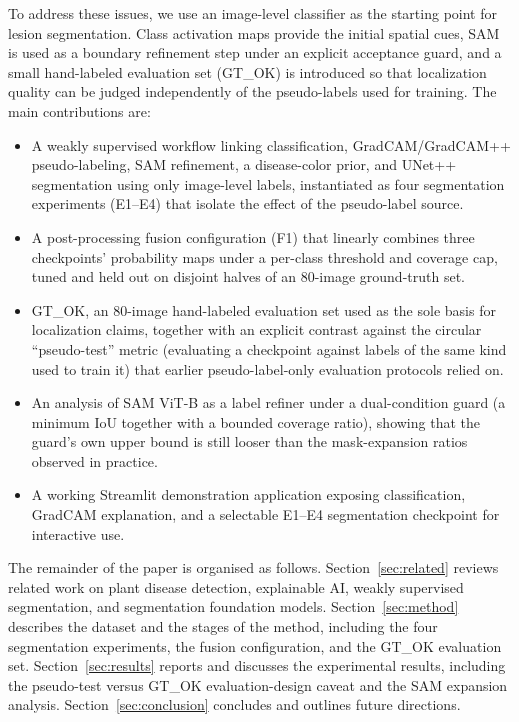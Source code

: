 \documentclass[final,5p,times,twocolumn,authoryear]{elsarticle}
\begin{document}
To address these issues, we use an image-level classifier as the starting point for lesion segmentation. Class activation maps provide the initial spatial cues, SAM is used as a boundary refinement step under an explicit acceptance guard, and a small hand-labeled evaluation set (GT\_OK) is introduced so that localization quality can be judged independently of the pseudo-labels used for training. The main contributions are:
\begin{itemize}
\item A weakly supervised workflow linking classification, GradCAM/GradCAM++ pseudo-labeling, SAM refinement, a disease-color prior, and UNet++ segmentation using only image-level labels, instantiated as four segmentation experiments (E1--E4) that isolate the effect of the pseudo-label source.
\item A post-processing fusion configuration (F1) that linearly combines three checkpoints' probability maps under a per-class threshold and coverage cap, tuned and held out on disjoint halves of an 80-image ground-truth set.
\item GT\_OK, an 80-image hand-labeled evaluation set used as the sole basis for localization claims, together with an explicit contrast against the circular ``pseudo-test'' metric (evaluating a checkpoint against labels of the same kind used to train it) that earlier pseudo-label-only evaluation protocols relied on.
\item An analysis of SAM ViT-B as a label refiner under a dual-condition guard (a minimum IoU together with a bounded coverage ratio), showing that the guard's own upper bound is still looser than the mask-expansion ratios observed in practice.
\item A working Streamlit demonstration application exposing classification, GradCAM explanation, and a selectable E1--E4 segmentation checkpoint for interactive use.
\end{itemize}

The remainder of the paper is organised as follows. Section~\ref{sec:related} reviews related work on plant disease detection, explainable AI, weakly supervised segmentation, and segmentation foundation models. Section~\ref{sec:method} describes the dataset and the stages of the method, including the four segmentation experiments, the fusion configuration, and the GT\_OK evaluation set. Section~\ref{sec:results} reports and discusses the experimental results, including the pseudo-test versus GT\_OK evaluation-design caveat and the SAM expansion analysis. Section~\ref{sec:conclusion} concludes and outlines future directions.
\end{document}
